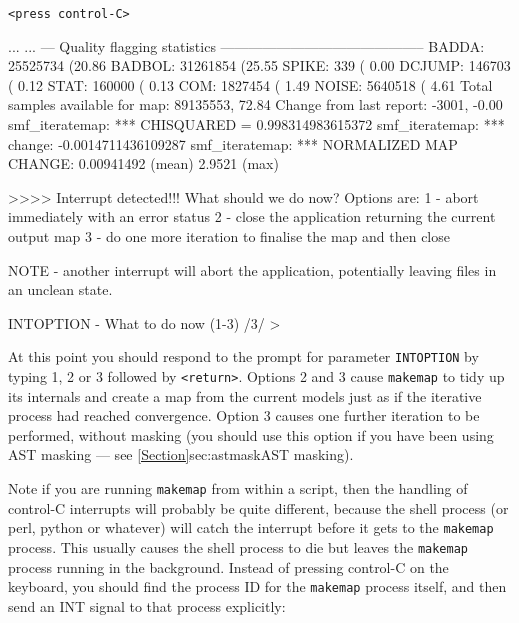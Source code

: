 \begin{terminalv}
\texttt{<press control-C>}

\begin{terminalv}
...
...
--- Quality flagging statistics
--------------------------------------------
 BADDA:   25525734 (20.86%
BADBOL:   31261854 (25.55%
 SPIKE:        339 ( 0.00%
DCJUMP:     146703 ( 0.12%
  STAT:     160000 ( 0.13%
   COM:    1827454 ( 1.49%
 NOISE:    5640518 ( 4.61%
Total samples available for map:   89135553, 72.84%
     Change from last report:      -3001, -0.00%
smf_iteratemap: *** CHISQUARED = 0.998314983615372
smf_iteratemap: *** change: -0.0014711436109287
smf_iteratemap: *** NORMALIZED MAP CHANGE: 0.00941492 (mean) 2.9521 (max)


>>>> Interrupt detected!!! What should we do now? Options are:
1 - abort immediately with an error status
2 - close the application returning the current output map
3 - do one more iteration to finalise the map and then close

NOTE - another interrupt will abort the application, potentially leaving
files in an unclean state.

INTOPTION - What to do now (1-3) /3/ >
\end{terminalv}

At this point you should respond to the prompt for parameter
\texttt{INTOPTION} by typing 1, 2 or 3 followed by \texttt{<return>}. Options 2
and 3 cause \texttt{makemap} to tidy up its internals and create a map
from the current models just as if the iterative process had reached
convergence. Option 3 causes one further iteration to be performed,
without masking (you should use this option if you have been using AST
masking --- see \cref{Section}{sec:astmask}{AST masking}).

\begin{tip}
Note if you are running \texttt{makemap} from within a script, then the
handling of control-C interrupts will probably be quite different, because
the shell process (or perl, python or whatever) will catch the interrupt
before it gets to the \texttt{makemap} process. This usually causes the
shell process to die but leaves the \texttt{makemap} process running in
the background. Instead of pressing control-C on the keyboard, you should
find the process ID for the \texttt{makemap} process itself, and then send an
INT signal to that process explicitly:


\end{tip}
\end{terminalv}
